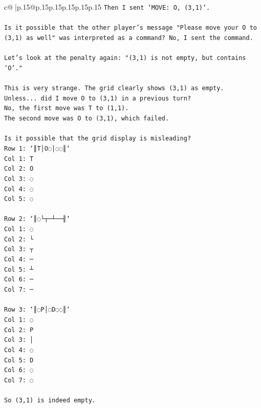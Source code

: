 \documentclass{article}
\begin{document}
{\begin{supertabular}{c@{$\;$}|p{.15\linewidth}@{}p{.15\linewidth}p{.15\linewidth}p{.15\linewidth}p{.15\linewidth}p{.15\linewidth}}
{{{\texttt{Then I sent `MOVE: O, (3,1)`.} \\
\\ 
\texttt{Is it possible that the other player's message "Please move your O to (3,1) as well" was interpreted as a command? No, I sent the command.} \\
\\ 
\texttt{Let's look at the penalty again: "(3,1) is not empty, but contains 'O'."} \\
\\ 
\texttt{This is very strange. The grid clearly shows (3,1) as empty.} \\
\texttt{Unless... did I move O to (3,1) in a previous turn?} \\
\texttt{No, the first move was T to (1,1).} \\
\texttt{The second move was O to (3,1), which failed.} \\
\\ 
\texttt{Is it possible that the grid display is misleading?} \\
\texttt{Row 1: `║T│O◌│◌◌║`} \\
\texttt{Col 1: T} \\
\texttt{Col 2: O} \\
\texttt{Col 3: ◌} \\
\texttt{Col 4: ◌} \\
\texttt{Col 5: ◌} \\
\\ 
\texttt{Row 2: `║◌└┬─┴──╢`} \\
\texttt{Col 1: ◌} \\
\texttt{Col 2: └} \\
\texttt{Col 3: ┬} \\
\texttt{Col 4: ─} \\
\texttt{Col 5: ┴} \\
\texttt{Col 6: ─} \\
\texttt{Col 7: ─} \\
\\ 
\texttt{Row 3: `║◌P│◌D◌◌║`} \\
\texttt{Col 1: ◌} \\
\texttt{Col 2: P} \\
\texttt{Col 3: │} \\
\texttt{Col 4: ◌} \\
\texttt{Col 5: D} \\
\texttt{Col 6: ◌} \\
\texttt{Col 7: ◌} \\
\\ 
\texttt{So (3,1) is indeed empty.} \\
}}}
\end{supertabular}}
\end{document}
